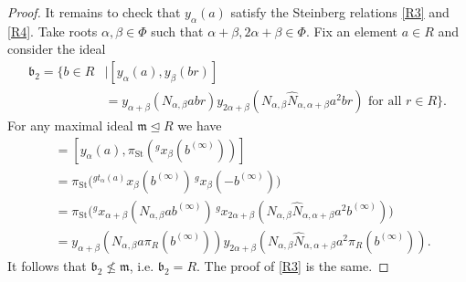 \documentclass{article}
\numberwithin{equation}{section}
\theoremstyle{definition}
\theoremstyle{remark}
\DeclareMathOperator\St{St}
\newcommand{\up}[2]{{^{#1}\!{#2}}}
\begin{document}
\begin{proof}
 It remains to check that \(y_\alpha(a)\) satisfy the Steinberg relations \eqref{R3} and \eqref{R4}. Take roots \(\alpha, \beta \in \Phi\) such that \(\alpha + \beta, 2\alpha + \beta \in \Phi\). Fix an element \(a \in R\) and consider the ideal
 \begin{align*}
 \mathfrak b_2 = \{b \in R &\mid [y_\alpha(a), y_\beta(br)]\\
 &= y_{\alpha + \beta}(N_{\alpha, \beta} abr)
 y_{2\alpha + \beta}(N_{\alpha, \beta} \widehat N_{\alpha, \alpha + \beta} a^2 br) \text{ for all } r \in R\}.
 \end{align*}
 For any maximal ideal \(\mathfrak m \trianglelefteq R\) we have
 \begin{align*}
 [y_\alpha(a), y_\beta(\pi_R(b^{(\infty)}))] &= [y_\alpha(a), \pi_{\St}(\up g{x_\beta(b^{(\infty)})})]\\
 &= \pi_{\St}\bigl(\up{g t_\alpha(a)}{x_\beta(b^{(\infty)})}\, \up g{x_\beta(-b^{(\infty)})}\bigr)\\
 &= \pi_{\St}\bigl(\up g{x_{\alpha + \beta}(N_{\alpha, \beta} a b^{(\infty)})}\, \up g{x_{2\alpha + \beta}(N_{\alpha, \beta} \widehat N_{\alpha, \alpha + \beta} a^2 b^{(\infty)})}\bigr)\\
 &= y_{\alpha + \beta}(N_{\alpha, \beta} a \pi_R(b^{(\infty)})) y_{2\alpha + \beta}(N_{\alpha, \beta} \widehat N_{\alpha, \alpha + \beta} a^2 \pi_R(b^{(\infty)})).
 \end{align*}
 It follows that \(\mathfrak b_2 \not \leq \mathfrak m\), i.e. \(\mathfrak b_2 = R\). The proof of \eqref{R3} is the same.
\end{proof}


\printbibliography
\end{document}
